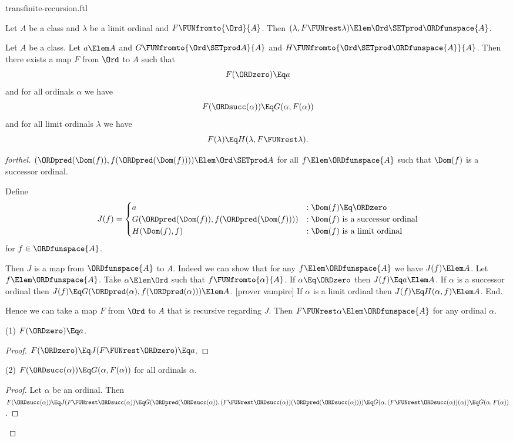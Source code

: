 \documentclass{stex}
\begin{document}
\begin{smodule}{transfinite-recursion.ftl}
\begin{lemma}[forthel]
  Let $A$ be a class and $\lambda$ be a limit ordinal and $F \FUNfromto{\Ord}{A}$.
  Then $(\lambda, F \FUNrest \lambda) \Elem \Ord \SETprod \ORDfunspace{A}$.
\end{lemma}

\begin{corollary}[forthel]
  Let $A$ be a class.
  Let $a \Elem A$ and $G \FUNfromto{\Ord \SETprod A}{A}$ and $H \FUNfromto{\Ord \SETprod \ORDfunspace{A}}{A}$.
  Then there exists a map $F$ from $\Ord$ to $A$ such that
  \[ F(\ORDzero) \Eq a \]
  and for all ordinals $\alpha$ we have
  \[ F(\ORDsucc(\alpha)) \Eq G(\alpha, F(\alpha)) \]
  and for all limit ordinals $\lambda$ we have
  \[ F(\lambda) \Eq H(\lambda, F \FUNrest \lambda). \]
\end{corollary}
\begin{proof}[forthel]
  $(\ORDpred(\Dom(f)), f(\ORDpred(\Dom(f)))) \Elem \Ord \SETprod A$ for all $f \Elem \ORDfunspace{A}$ such that $\Dom(f)$ is a successor ordinal.

  Define  \[ J(f) =
    \begin{cases}
      a
      & : \Dom(f) \Eq \ORDzero
      \\
      G(\ORDpred(\Dom(f)), f(\ORDpred(\Dom(f))))
      & : \text{$\Dom(f)$ is a successor ordinal}
      \\
      H(\Dom(f), f)
      & : \text{$\Dom(f)$ is a limit ordinal}
    \end{cases} \]
  for $f \in \ORDfunspace{A}$.

  Then $J$ is a map from $\ORDfunspace{A}$ to $A$.
  Indeed we can show that for any $f \Elem \ORDfunspace{A}$ we have $J(f) \Elem A$.
    Let $f \Elem \ORDfunspace{A}$.
    Take $\alpha \Elem \Ord$ such that $f \FUNfromto{\alpha}{A}$.
    If $\alpha \Eq \ORDzero$ then $J(f) \Eq a \Elem A$.
    If $\alpha$ is a successor ordinal then $J(f) \Eq
    G(\ORDpred(\alpha), f(\ORDpred(\alpha))) \Elem A$.
    [prover vampire]
    If $\alpha$ is a limit ordinal then $J(f) \Eq H(\alpha, f) \Elem A$.
  End.

  Hence we can take a map $F$ from $\Ord$ to $A$ that is recursive regarding $J$.
  Then $F \FUNrest \alpha \Elem \ORDfunspace{A}$ for any ordinal $\alpha$.

  (1) $F(\ORDzero) \Eq a$.
  \begin{proof}
    $F(\ORDzero)
      \Eq J(F \FUNrest \ORDzero)
      \Eq a$.
  \end{proof}

  (2) $F(\ORDsucc(\alpha)) \Eq G(\alpha, F(\alpha))$ for all ordinals $\alpha$.
  \begin{proof}
    Let $\alpha$ be an ordinal.
    Then $F(\ORDsucc(\alpha))
      \Eq J(F \FUNrest \ORDsucc(\alpha))
      \Eq G(\ORDpred(\ORDsucc(\alpha)), (F \FUNrest \ORDsucc(\alpha))(\ORDpred(\ORDsucc(\alpha))))
      \Eq G(\alpha, (F \FUNrest \ORDsucc(\alpha))(\alpha))
      \Eq G(\alpha, F(\alpha))$.
  \end{proof}


\end{proof}
\end{smodule}
\end{document}
